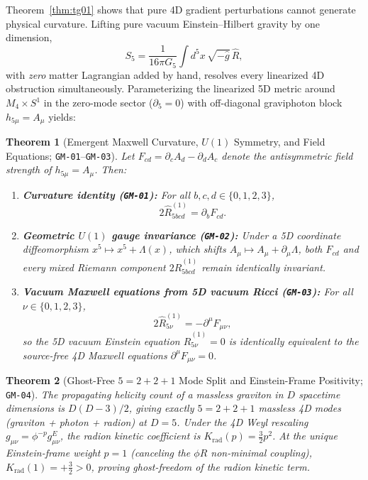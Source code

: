 \documentclass[11pt,a4paper]{article}
\theoremstyle{plain}
\newtheorem{theorem}{Theorem}[section]
\theoremstyle{remark}
\newcommand{\dd}{\partial}
\newcommand{\Rhat}{\widehat{R}}
\newcommand{\ghat}{\widehat{g}}
\newcommand{\code}[1]{\texttt{\small #1}}
\begin{document}
Theorem~\ref{thm:tg01} shows that pure 4D gradient perturbations cannot generate physical curvature. Lifting pure vacuum Einstein--Hilbert gravity by one dimension,
\begin{equation}
  S_5 = \frac{1}{16\pi G_5}\int d^5x\,\sqrt{-\ghat}\,\Rhat,
\end{equation}
with \emph{zero} matter Lagrangian added by hand, resolves every linearized 4D obstruction simultaneously. Parameterizing the linearized 5D metric around $M_4 \times S^1$ in the zero-mode sector ($\dd_5 = 0$) with off-diagonal graviphoton block $h_{5\mu} = A_\mu$ yields:

\begin{theorem}[Emergent Maxwell Curvature, $U(1)$ Symmetry, and Field Equations; \code{GM-01}--\code{GM-03}]
\label{thm:gm01-03}
Let $F_{cd} = \dd_c A_d - \dd_d A_c$ denote the antisymmetric field strength of $h_{5\mu} = A_\mu$. Then:
\begin{enumerate}
  \item \textbf{Curvature identity (\code{GM-01}):} For all $b,c,d \in \{0,1,2,3\}$,
  \begin{equation}
    2 \Rhat^{(1)}_{5 b c d} = \dd_b F_{cd}.
  \end{equation}
  \item \textbf{Geometric $U(1)$ gauge invariance (\code{GM-02}):} Under a 5D coordinate diffeomorphism $x^5 \mapsto x^5 + \Lambda(x)$, which shifts $A_\mu \mapsto A_\mu + \dd_\mu\Lambda$, both $F_{cd}$ and every mixed Riemann component $2\Rhat^{(1)}_{5bcd}$ remain identically invariant.
  \item \textbf{Vacuum Maxwell equations from 5D vacuum Ricci (\code{GM-03}):} For all $\nu \in \{0,1,2,3\}$,
  \begin{equation}
    2 \Rhat^{(1)}_{5\nu} = -\dd^\mu F_{\mu\nu},
  \end{equation}
  so the 5D vacuum Einstein equation $\Rhat^{(1)}_{5\nu} = 0$ is identically equivalent to the source-free 4D Maxwell equations $\dd^\mu F_{\mu\nu} = 0$.
\end{enumerate}
\end{theorem}

\begin{theorem}[Ghost-Free $5 = 2+2+1$ Mode Split and Einstein-Frame Positivity; \code{GM-04}]
\label{thm:gm04}
The propagating helicity count of a massless graviton in $D$ spacetime dimensions is $D(D-3)/2$, giving exactly $5 = 2 + 2 + 1$ massless 4D modes (graviton + photon + radion) at $D = 5$. Under the 4D Weyl rescaling $g_{\mu\nu} = \phi^{-p} g^E_{\mu\nu}$, the radion kinetic coefficient is $K_{\mathrm{rad}}(p) = \tfrac{3}{2}p^2$. At the unique Einstein-frame weight $p = 1$ (canceling the $\phi R$ non-minimal coupling), $K_{\mathrm{rad}}(1) = +\tfrac{3}{2} > 0$, proving ghost-freedom of the radion kinetic term.
\end{theorem}
\end{document}
